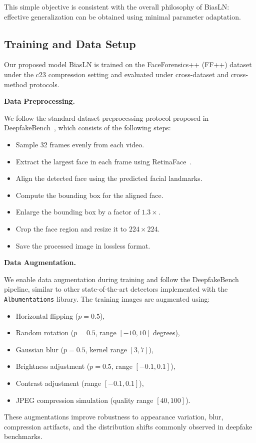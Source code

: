 \documentclass[fonts]{icst}
\begin{document}
This simple objective is consistent with the overall philosophy of BiasLN: effective generalization can be obtained using minimal parameter adaptation.

\subsection{Training and Data Setup}

Our proposed model BiasLN is trained on the FaceForensics++ (FF++) dataset under the c23 compression setting and evaluated under cross-dataset and cross-method protocols.

\noindent\textbf{Data Preprocessing.}\par
We follow the standard dataset preprocessing protocol proposed in DeepfakeBench~\cite{yan2023deepfakebench}, which consists of the following steps:
\begin{itemize}[leftmargin=*, topsep=2pt, itemsep=2pt, label=--]
    \item Sample 32 frames evenly from each video.
    \item Extract the largest face in each frame using RetinaFace~\cite{deng2020retinaface}.
    \item Align the detected face using the predicted facial landmarks.
    \item Compute the bounding box for the aligned face.
    \item Enlarge the bounding box by a factor of $1.3\times$.
    \item Crop the face region and resize it to $224 \times 224$.
    \item Save the processed image in lossless format.
\end{itemize}

\noindent\textbf{Data Augmentation.}\par
We enable data augmentation during training and follow the DeepfakeBench~\cite{yan2023deepfakebench} pipeline, similar to other state-of-the-art detectors implemented with the \texttt{Albumentations} library.
The training images are augmented using:
\begin{itemize}[leftmargin=*, topsep=2pt, itemsep=2pt, label=--]
    \item Horizontal flipping ($p = 0.5$),
    \item Random rotation ($p = 0.5$, range $[-10, 10]$ degrees),
    \item Gaussian blur ($p = 0.5$, kernel range $[3, 7]$),
    \item Brightness adjustment ($p = 0.5$, range $[-0.1, 0.1]$),
    \item Contrast adjustment (range $[-0.1, 0.1]$),
    \item JPEG compression simulation (quality range $[40, 100]$).
\end{itemize}
These augmentations improve robustness to appearance variation, blur, compression artifacts, and the distribution shifts commonly observed in deepfake benchmarks.
\end{document}
